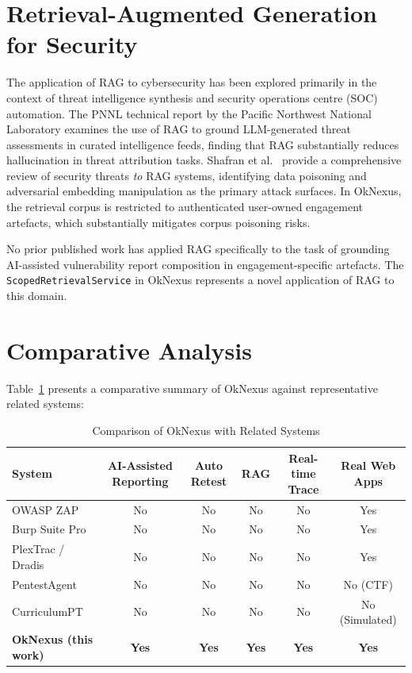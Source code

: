 \section{Retrieval-Augmented Generation for Security}

The application of RAG to cybersecurity has been explored primarily in the context of threat intelligence synthesis and security operations centre (SOC) automation. The PNNL technical report by the Pacific Northwest National Laboratory \cite{rag_robust_cybersecurity2024} examines the use of RAG to ground LLM-generated threat assessments in curated intelligence feeds, finding that RAG substantially reduces hallucination in threat attribution tasks. Shafran et al.\ \cite{rag_security_comprehensive2026} provide a comprehensive review of security threats \textit{to} RAG systems, identifying data poisoning and adversarial embedding manipulation as the primary attack surfaces. In OkNexus, the retrieval corpus is restricted to authenticated user-owned engagement artefacts, which substantially mitigates corpus poisoning risks.

No prior published work has applied RAG specifically to the task of grounding AI-assisted vulnerability report composition in engagement-specific artefacts. The \texttt{ScopedRetrievalService} in OkNexus represents a novel application of RAG to this domain.

\section{Comparative Analysis}

Table~\ref{tab:comparison} presents a comparative summary of OkNexus against representative related systems:

\begin{table}[h!]
\centering
\caption{Comparison of OkNexus with Related Systems}
\label{tab:comparison}
\begin{tabular}{|p{3.2cm}|c|c|c|c|c|}
\hline
\textbf{System} & \textbf{AI-Assisted Reporting} & \textbf{Auto Retest} & \textbf{RAG} & \textbf{Real-time Trace} & \textbf{Real Web Apps} \\
\hline
OWASP ZAP & No & No & No & No & Yes \\
Burp Suite Pro & No & No & No & No & Yes \\
PlexTrac / Dradis & No & No & No & No & Yes \\
PentestAgent \cite{pentest_agent2024} & No & No & No & No & No (CTF) \\
CurriculumPT \cite{curriculum_pt2025} & No & No & No & No & No (Simulated) \\
\textbf{OkNexus (this work)} & \textbf{Yes} & \textbf{Yes} & \textbf{Yes} & \textbf{Yes} & \textbf{Yes} \\
\hline
\end{tabular}
\end{table}

